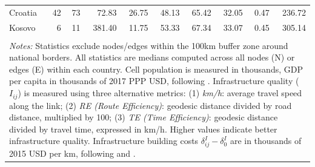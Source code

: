 \documentclass[a4paper]{article}
\begin{document}
\begin{table}[h!]
\begin{tabular}{lrrrrrrrrr}
  Croatia &  42 &  73 & 72.83 & 26.75 & 48.13 & 65.42 & 32.05 & 0.47 & 236.72 \\ 
  Kosovo &   6 &  11 & 381.40 & 11.75 & 53.33 & 67.34 & 33.07 & 0.45 & 305.14 \\  
   \bottomrule   \\ [-0.9em]
\multicolumn{10}{l}{\parbox{0.9\textwidth}{\scriptsize
\textit{Notes:} Statistics exclude nodes/edges within the 100km buffer zone around national borders. All statistics are medians computed across all nodes (N) or edges (E) within each country. Cell population is measured in thousands, GDP per capita in thousands of 2017 PPP USD, following \citet{LGEAW}. Infrastructure quality ($I_{ij}$) is measured using three alternative metrics: (1) \textit{km/h}: average travel speed along the link; (2) \textit{RE (Route Efficiency)}: geodesic distance divided by road distance, multiplied by 100; (3) \textit{TE (Time Efficiency)}: geodesic distance divided by travel time, expressed in km/h. Higher values indicate better infrastructure quality. Infrastructure building costs $\delta^I_{ij}-\delta^I_0$ are in thousands of 2015 USD per km, following \citet{collier2016cost} and \citet{fajgelbaum2020optimal}.}} 
\end{tabular}
\end{table}



\end{document}
